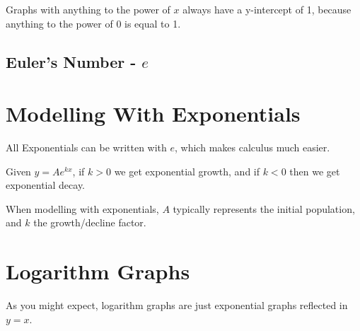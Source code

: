 Graphs with anything to the power of \(x\) always have a y-intercept of 1, because anything to the power of 0 is equal to 1.

\subsection{Euler's Number - \(e\)}



\section{Modelling With Exponentials}
All Exponentials can be written with \(e\), which makes calculus much easier.

Given \(y = Ae^{kx}\), if \(k > 0\) we get exponential growth, and if \(k < 0\) then we get exponential decay.

When modelling with exponentials, \(A\) typically represents the initial population, and \(k\) the growth/decline factor.

\section{Logarithm Graphs}

As you might expect, logarithm graphs are just exponential graphs reflected in \(y=x\).



